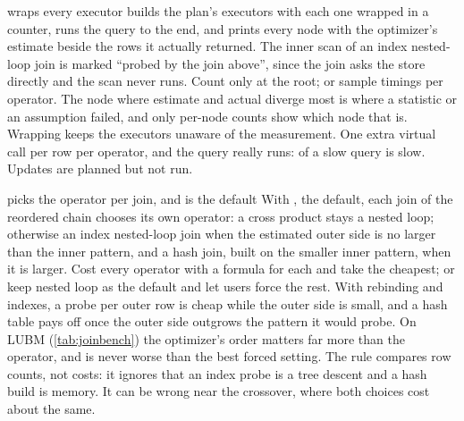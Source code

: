 \begin{decision}{ wraps every executor}
  builds the plan's executors
with each one wrapped in a counter, runs the query to the end, and prints every
node with the optimizer's estimate beside the rows it actually returned. The
inner scan of an index nested-loop join is marked ``probed by the join above'',
since the join asks the store directly and the scan never runs.
 Count only at the root; or sample timings per operator.
 The node where estimate and actual diverge most is where a
statistic or an assumption failed, and only per-node counts show which node
that is. Wrapping keeps the executors unaware of the measurement.
 One extra virtual call per row per operator, and the query really
runs:  of a slow query is slow. Updates are planned but
not run.
\end{decision}

\begin{decision}{ picks the operator per join, and is the default}
 With , the default, each join
of the reordered chain chooses its own operator: a cross product stays a nested
loop; otherwise an index nested-loop join when the estimated outer side is no
larger than the inner pattern, and a hash join, built on the smaller inner
pattern, when it is larger.
 Cost every operator with a formula for each and take the
cheapest; or keep nested loop as the default and let users force the rest.
 With rebinding and indexes, a probe per outer row is cheap while
the outer side is small, and a hash table pays off once the outer side
outgrows the pattern it would probe. On LUBM (\cref{tab:joinbench}) the
optimizer's order matters far more than the operator, and  is never
worse than the best forced setting.
 The rule compares row counts, not costs: it ignores that an index
probe is a tree descent and a hash build is memory. It can be wrong near the
crossover, where both choices cost about the same.
\end{decision}

